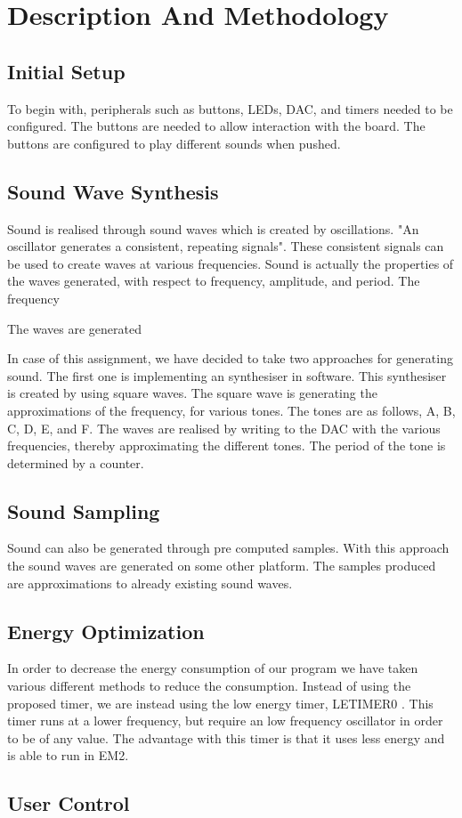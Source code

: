 \section{Description And Methodology}


\subsection{Initial Setup}
To begin with, peripherals such as buttons, LEDs, DAC, and timers needed to be configured. The buttons are needed to allow interaction with the board. The buttons are configured to play different sounds when pushed.


\subsection{Sound Wave Synthesis}
Sound is realised through sound waves which is created by oscillations. "An oscillator generates a consistent, repeating signals". These consistent signals can be used to create waves at various frequencies. Sound is actually the properties of the waves generated, with respect to frequency, amplitude, and period. The frequency 

The waves are generated  


In case of this assignment, we have decided to take two approaches for generating sound. The first one is implementing an synthesiser in software. This synthesiser is created by using square waves. The square wave is generating the approximations of the frequency, for various tones. The tones are as follows, A, B, C, D, E, and F. The waves are realised by writing to the DAC with the various frequencies, thereby approximating the different tones. The period of the tone is determined by a counter.

  


\subsection{Sound Sampling}
Sound can also be generated through pre computed samples. With this approach the sound waves are generated on some other platform. The samples produced are approximations to already existing sound waves.


\subsection{Energy Optimization}
In order to decrease the energy consumption of our program we have taken various different methods to reduce the consumption. Instead of using the proposed timer\cite{compendium}, we are instead using the low energy timer, LETIMER0 \cite{EFM32GG-rm}. This timer runs at a lower frequency, but require an low frequency oscillator in order to be of any value. The advantage with this timer is that it uses less energy and is able to run in EM2.  



\subsection{User Control}













